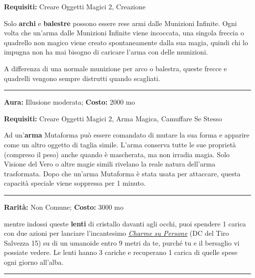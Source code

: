 \begin{multicols}{2}
\textbf{Requisiti:} Creare Oggetti Magici 2, Creazione

Solo \textbf{archi} e \textbf{balestre} possono essere rese armi dalle Munizioni Infinite. Ogni volta che un'arma dalle Munizioni Infinite viene incoccata, una singola freccia o quadrello non magico viene creato spontaneamente dalla sua magia, quindi chi lo impugna non ha mai bisogno di caricare l'arma con delle munizioni.

A differenza di una normale munizione per arco o balestra, queste frecce e quadrelli vengono sempre distrutti quando scagliati.

\smallskip\noindent\rule{\linewidth}{2pt}  \hypertarget{Mutaforma}{}\smallskip{}\noindent\label{Mutaforma}

\textbf{Aura:} Illusione moderata; \textbf{Costo:} 2000 mo

\textbf{Requisiti:} Creare Oggetti Magici 2, Arma Magica, Camuffare Se Stesso

Ad un'\textbf{arma} Mutaforma può essere comandato di mutare la sua forma e apparire come un altro oggetto di taglia simile. L'arma conserva tutte le sue proprietà (compreso il peso) anche quando è mascherata, ma non irradia magia. Solo Visione del Vero o altre magie simili rivelano la reale natura dell'arma trasformata. Dopo che un'arma Mutaforma è stata usata per attaccare, questa capacità speciale viene soppressa per 1 minuto.

\smallskip\noindent\rule{\linewidth}{2pt}  \hypertarget{OcchiAffascinanti}{}\smallskip{}\noindent\label{OcchiAffascinanti}

\textbf{Rarità:} Non Comune; \textbf{Costo:} 3000 mo

mentre indossi queste \textbf{lenti} di cristallo davanti agli occhi, puoi spendere 1 carica con due azioni per lanciare l'incantesimo \emph{\hyperlink{Charme su Persone}{Charme su Persone}} (DC del Tiro Salvezza 15) su di un umanoide entro 9 metri da te, purché tu e il bersaglio vi possiate vedere. Le lenti hanno 3 cariche e recuperano 1 carica di quelle spese ogni giorno all'alba.

\smallskip\noindent\rule{\linewidth}{2pt}  \hypertarget{Occhidell'Aquila}{}\smallskip{}\noindent\label{Occhidell'Aquila}


\end{multicols}
